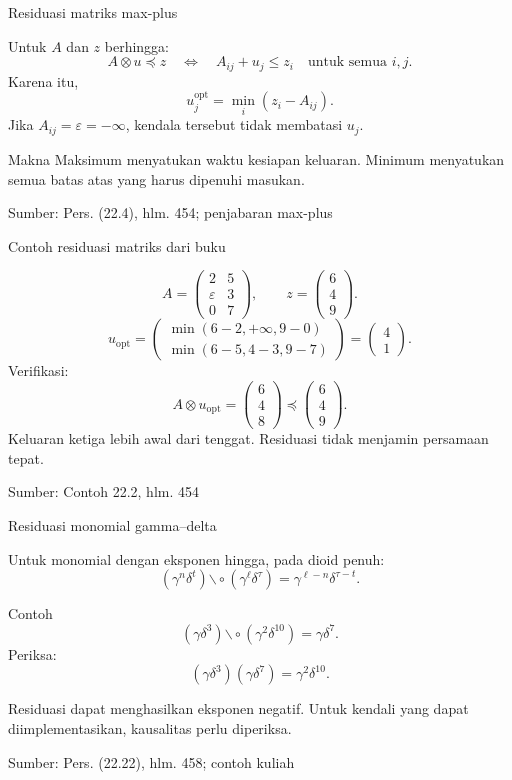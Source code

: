 \documentclass[aspectratio=169,11pt]{beamer}
\newcommand{\source}[1]{%
    \vfill
    \hfill{\tiny\color{gray}Sumber: #1}
}
\newcommand{\eps}{\varepsilon}
\newcommand{\mpmat}[1]{\begin{pmatrix}#1\end{pmatrix}}
\newcommand{\res}{\mathbin{\backslash\!\circ}}
\begin{document}
\begin{frame}{Residuasi matriks max-plus}


Untuk $A$ dan $z$ berhingga:
\[
A\otimes u\preceq z
\quad\Longleftrightarrow\quad
A_{ij}+u_j\le z_i\quad\text{untuk semua }i,j.
\]
Karena itu,
\[
u_j^{\mathrm{opt}}=\min_i(z_i-A_{ij}).
\]
Jika $A_{ij}=\eps=-\infty$, kendala tersebut tidak membatasi $u_j$.
\begin{block}{Makna}
Maksimum menyatukan waktu kesiapan keluaran.
Minimum menyatukan semua batas atas yang harus dipenuhi masukan.
\end{block}

\source{Pers. (22.4), hlm. 454; penjabaran max-plus}

\end{frame}
\begin{frame}{Contoh residuasi matriks dari buku}


\[
A=\mpmat{2&5\\\eps&3\\0&7},\qquad z=\mpmat{6\\4\\9}.
\]
\[
u_{\mathrm{opt}}=
\mpmat{\min(6-2,+\infty,9-0)\\
\min(6-5,4-3,9-7)}
=\mpmat{4\\1}.
\]
Verifikasi:
\[
A\otimes u_{\mathrm{opt}}=\mpmat{6\\4\\8}
\preceq\mpmat{6\\4\\9}.
\]
Keluaran ketiga lebih awal dari tenggat. Residuasi tidak menjamin persamaan tepat.

\source{Contoh 22.2, hlm. 454}

\end{frame}
\begin{frame}{Residuasi monomial gamma--delta}


Untuk monomial dengan eksponen hingga, pada dioid penuh:
\[
(\gamma^n\delta^t)\res(\gamma^\ell\delta^\tau)
=\gamma^{\ell-n}\delta^{\tau-t}.
\]
\begin{exampleblock}{Contoh}
\[
(\gamma\delta^3)\res(\gamma^2\delta^{10})
=\gamma\delta^7.
\]
Periksa:
\[
(\gamma\delta^3)(\gamma\delta^7)=\gamma^2\delta^{10}.
\]
\end{exampleblock}
Residuasi dapat menghasilkan eksponen negatif.
Untuk kendali yang dapat diimplementasikan, kausalitas perlu diperiksa.

\source{Pers. (22.22), hlm. 458; contoh kuliah}

\end{frame}
\end{document}
